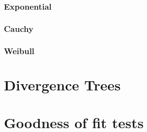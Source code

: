 		\subsection{Exponential}
		
		\subsection{Cauchy}
		
		\subsection{Weibull}
	
\chapter{Divergence Trees}

\chapter{Goodness of fit tests}